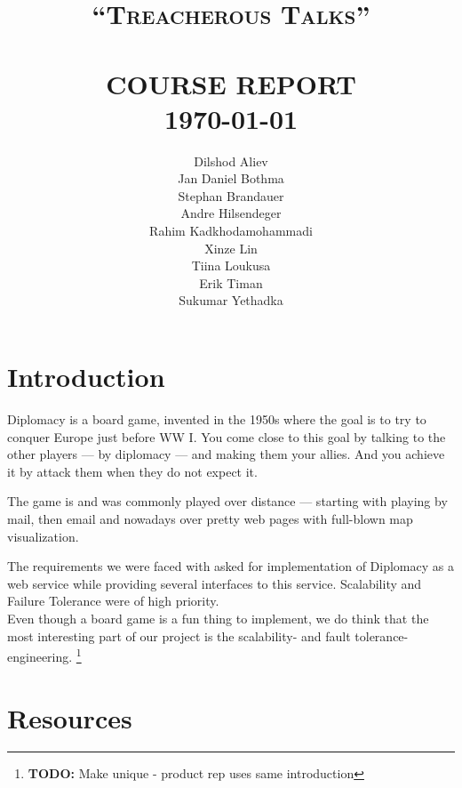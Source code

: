 \documentclass[11pt,a4paper]{report}
\title{    \normalsize \textsc{``Treacherous Talks''} %
             \\[2.0cm]                                %
            \HRule{0.5pt} \\                          %
            \LARGE \textbf{\uppercase{Course Report}} %
            \HRule{2pt} \\ [0.5cm]                    %
            \normalsize \today                        %
        }
\author{Dilshod Aliev\\
        Jan Daniel Bothma\\
        Stephan Brandauer\\
        Andre Hilsendeger\\
        Rahim Kadkhodamohammadi\\
        Xinze Lin\\
        Tiina Loukusa\\
        Erik Timan\\
        Sukumar Yethadka\\
        }
\makeatletter
\newcommand{\todo}[1]{\footnote{{\color{red} {\bf TODO:} #1}}}
\def\printtitle{
    {\centering \@title\par}}
\def\printauthor{
    {\centering \large \@author}}
\makeatother
\begin{document}
\thispagestyle{empty}                %

\printtitle
\vfill
\printauthor

\tableofcontents

\chapter{Introduction}
Diplomacy is a board game, invented in the 1950s where the goal is to try to
conquer Europe just before WW I. You come close to this goal by talking to the
other players --- by diplomacy --- and making them your allies. And you achieve
it by attack them when they do not expect it.

The game is and was commonly played over distance --- starting with playing by
mail, then email and nowadays over pretty web pages with full-blown map
visualization.

The requirements we were faced with asked for implementation of Diplomacy as a
web service while providing several interfaces to this service. Scalability and
Failure Tolerance were of high priority. \\
Even though a board game is a fun thing to implement, we do think that the most
interesting part of our project is the scalability- and fault tolerance-
engineering.
\todo{Make unique - product rep uses same introduction}

\chapter{Resources}
\end{document}
